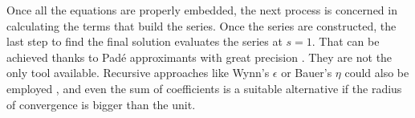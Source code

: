 \documentclass[conference]{IEEEtran}
\begin{document}
Once all the equations are properly embedded, the next process is concerned in calculating the terms that build the series. Once the series are constructed, the last step to find the final solution evaluates the series at $s=1$. That can be achieved thanks to Padé approximants with great precision \cite{Trias2018}. They are not the only tool available. Recursive approaches like Wynn's $\epsilon$ or Bauer's $\eta$ could also be employed \cite{Rao}, and even the sum of coefficients is a suitable alternative if the radius of convergence is bigger than the unit.


\end{document}
